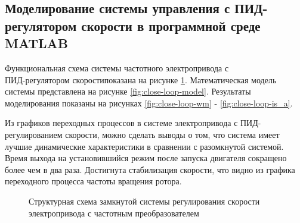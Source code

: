         \clearpage
    
    \subsection{Моделирование системы управления с ПИД-регулятором скорости в
        программной среде MATLAB}

        Функциональная схема системы частотного электропривода с\\
        ПИД-регулятором скоростипоказана на рисунке \ref{fig:struct-new}.
        Математическая модель системы представлена на 
        рисунке \ref{fig:close-loop-model}. Результаты моделирования показаны на рисунках
        \ref{fig:close-loop-wm} - \ref{fig:close-loop-is_a}.

        Из графиков переходных процессов в системе электропривода с
        ПИД-регулированием скорости, можно сделать выводы о том, что система
        имеет лучшие динамические характеристики в сравнении с разомкнутой
        системой. Время выхода на установившийся режим после запуска двигателя
        сокращено более чем в два раза. Достигнута стабилизация скорости, что
        видно из графика переходного процесса частоты вращения   ротора.
        
        \begin{figure}[h!]
            \caption{Структурная схема замкнутой системы регулирования скорости
                электропривода с частотным преобразователем}
            \label{fig:struct-new}
        \end{figure}


